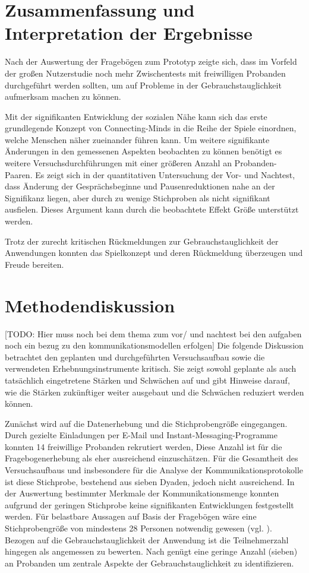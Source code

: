 \section{Zusammenfassung und Interpretation der Ergebnisse}
Nach der Auswertung der Fragebögen zum Prototyp zeigte sich, dass im Vorfeld der großen Nutzerstudie noch mehr Zwischentests mit freiwilligen Probanden durchgeführt werden sollten, um auf Probleme in der Gebrauchstauglichkeit aufmerksam machen zu können. 

Mit der signifikanten Entwicklung der sozialen Nähe kann sich das erste grundlegende Konzept von Connecting-Minds in die Reihe der Spiele einordnen, welche Menschen näher zueinander führen kann. Um weitere signifikante Änderungen in den gemessenen Aspekten beobachten zu können benötigt es weitere Versuchsdurchführungen mit einer größeren Anzahl an Probanden-Paaren. Es zeigt sich in der quantitativen Untersuchung der Vor- und Nachtest, dass Änderung der Gesprächsbeginne und Pausenreduktionen nahe an der Signifikanz liegen, aber durch zu wenige Stichproben als nicht signifikant ausfielen. Dieses Argument kann durch die beobachtete Effekt Größe unterstützt werden. 

Trotz der zurecht kritischen Rückmeldungen zur Gebrauchstauglichkeit der Anwendungen konnten das Spielkonzept und deren Rückmeldung überzeugen und Freude bereiten.

\section{Methodendiskussion}
[TODO: Hier muss noch bei dem thema zum vor/ und nachtest bei den aufgaben noch ein bezug zu den kommunikationsmodellen erfolgen]
Die folgende Diskussion betrachtet den geplanten und durchgeführten Versuchsaufbau sowie die verwendeten Erhebnungsinstrumente kritisch. Sie zeigt sowohl geplante als auch tatsächlich eingetretene Stärken und Schwächen auf und gibt Hinweise darauf, wie die Stärken zukünftiger weiter ausgebaut und die Schwächen reduziert werden können.

Zunächst wird auf die Datenerhebung und die Stichprobengröße eingegangen.
Durch gezielte Einladungen per E-Mail und Instant-Messaging-Programme konnten 14 freiwillige Probanden rekrutiert werden, Diese Anzahl ist für die Fragebogenerhebung als eher ausreichend einzuschätzen. Für die Gesamtheit des Versuchsaufbaus und insbesondere für die Analyse der Kommunikationsprotokolle ist diese Stichprobe, bestehend aus sieben Dyaden, jedoch nicht ausreichend. In der Auswertung bestimmter Merkmale der Kommunikationsmenge konnten aufgrund der geringen Stichprobe keine signifikanten Entwicklungen festgestellt werden. Für belastbare Aussagen auf Basis der Fragebögen wäre eine Stichprobengröße von mindestens 28 Personen notwendig gewesen (vgl. \cite[S. 158]{cohen_power_1992}). 
Bezogen auf die Gebrauchstauglichkeit der Anwendung ist die Teilnehmerzahl hingegen als angemessen zu bewerten. Nach \cite[S. 3088]{turner_determining_2006} genügt eine geringe Anzahl (sieben) an Probanden um zentrale Aspekte der Gebrauchstauglichkeit zu identifizieren.

